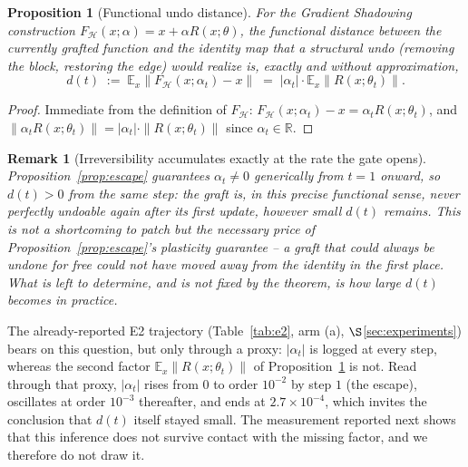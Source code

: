 \documentclass[11pt,a4paper]{article}
\newtheorem{proposition}{Proposition}
\newtheorem{remark}{Remark}
\newcommand{\Hb}{\mathcal{H}}
\begin{document}
\begin{proposition}[Functional undo distance]
\label{prop:undo-distance}
For the Gradient Shadowing construction $F_{\Hb}(x;\alpha) = x + \alpha R(x;\theta)$, the
functional distance between the currently grafted function and the identity map that a
\emph{structural} undo (removing the block, restoring the edge) would realize is, exactly and
without approximation,
\[
d(t) \;:=\; \mathbb{E}_x\big\|F_{\Hb}(x;\alpha_t) - x\big\| \;=\; |\alpha_t|\cdot \mathbb{E}_x\big\|R(x;\theta_t)\big\|.
\]
\end{proposition}

\begin{proof}
Immediate from the definition of $F_{\Hb}$: $F_{\Hb}(x;\alpha_t)-x = \alpha_t R(x;\theta_t)$, and
$\|\alpha_t R(x;\theta_t)\| = |\alpha_t|\cdot\|R(x;\theta_t)\|$ since $\alpha_t\in\mathbb{R}$.
\end{proof}

\begin{remark}[Irreversibility accumulates exactly at the rate the gate opens]
Proposition~\ref{prop:escape} guarantees $\alpha_t\neq0$ generically from $t=1$ onward, so
$d(t)>0$ from the same step: the graft is, in this precise functional sense, never perfectly
undoable again after its first update, however small $d(t)$ remains. This is not a shortcoming to
patch but the necessary price of Proposition~\ref{prop:escape}'s plasticity guarantee -- a graft
that could always be undone for free could not have moved away from the identity in the first
place. What is left to determine, and is not fixed by the theorem, is how large $d(t)$ becomes in
practice.
\end{remark}

The already-reported E2 trajectory (Table~\ref{tab:e2}, arm (a), $\S$\ref{sec:experiments}) bears
on this question, but only through a proxy: $|\alpha_t|$ is logged at every step, whereas the
second factor $\mathbb{E}_x\|R(x;\theta_t)\|$ of Proposition~\ref{prop:undo-distance} is not.
Read through that proxy, $|\alpha_t|$ rises from $0$ to order $10^{-2}$ by step $1$ (the escape),
oscillates at order $10^{-3}$ thereafter, and ends at $2.7\times10^{-4}$, which invites the
conclusion that $d(t)$ itself stayed small. The measurement reported next shows that this
inference does not survive contact with the missing factor, and we therefore do not draw it.
\end{document}
